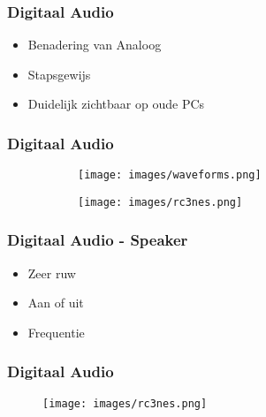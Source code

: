 \documentclass[aspectratio=43]{uva-inf-presentation}
\begin{document}

\begin{frame}
\frametitle{Digitaal Audio}

\begin{itemize}
\item Benadering van Analoog
\item Stapsgewijs
\item Duidelijk zichtbaar op oude PCs
\end{itemize}

\end{frame}


\begin{frame}
\frametitle[fragile]{Digitaal Audio}

\begin{figure}
	\begin{subfigure}[b]{0.4\textwidth}
		\texttt{[image: images/waveforms.png]}
	\end{subfigure}
	\begin{subfigure}[b]{0.5\textwidth}
		\texttt{[image: images/rc3nes.png]}
	\end{subfigure}
\end{figure}

\end{frame}


\begin{frame}
\frametitle{Digitaal Audio - Speaker}

\begin{itemize}
\item Zeer ruw
\item Aan of uit
\item Frequentie
\end{itemize}

\end{frame}


\begin{frame}
\frametitle{Digitaal Audio}

\begin{figure}
\texttt{[image: images/rc3nes.png]}
\end{figure}

\end{frame}
\end{document}
